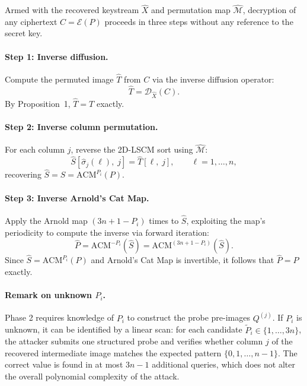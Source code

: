 Armed with the recovered keystream $\hat{X}$ and permutation map $\hat{\mathcal{M}}$, decryption of any ciphertext $C = \mathcal{E}(P)$ proceeds in three steps without any reference to the secret key.

\paragraph{Step 1: Inverse diffusion.}
Compute the permuted image $\hat{T}$ from $C$ via the inverse diffusion operator:
\begin{equation}
    \hat{T} = \mathcal{D}_{\hat{X}}(C).
\end{equation}
By Proposition~1, $\hat{T} = T$ exactly.

\paragraph{Step 2: Inverse column permutation.}
For each column $j$, reverse the 2D-LSCM sort using $\hat{\mathcal{M}}$:
\begin{equation}
    \hat{S}[\hat{\sigma}_j(\ell),\; j] = \hat{T}[\ell,\; j], \qquad \ell = 1, \ldots, n,
\end{equation}
recovering $\hat{S} = S = \mathrm{ACM}^{P_i}(P)$.

\paragraph{Step 3: Inverse Arnold's Cat Map.}
Apply the Arnold map $(3n+1-P_i)$ times to $\hat{S}$, exploiting the map's periodicity to compute the inverse via forward iteration:
\begin{equation}
    \hat{P} = \mathrm{ACM}^{-P_i}(\hat{S}) = \mathrm{ACM}^{(3n+1-P_i)}(\hat{S}).
\end{equation}
Since $\hat{S} = \mathrm{ACM}^{P_i}(P)$ and Arnold's Cat Map is invertible, it follows that $\hat{P} = P$ exactly.

\paragraph{Remark on unknown $P_i$.}
Phase 2 requires knowledge of $P_i$ to construct the probe pre-images $Q^{(j)}$. If $P_i$ is unknown, it can be identified by a linear scan: for each candidate $\tilde{P}_i \in \{1, \ldots, 3n\}$, the attacker submits one structured probe and verifies whether column $j$ of the recovered intermediate image matches the expected pattern $\{0, 1, \ldots, n-1\}$. The correct value is found in at most $3n-1$ additional queries, which does not alter the overall polynomial complexity of the attack.

